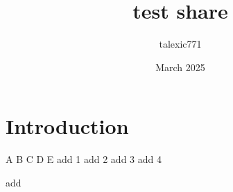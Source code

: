 \documentclass{article}
\title{test share}
\author{talexic771 }
\date{March 2025}
\begin{document}
\maketitle

\section{Introduction}
A
B
C
D
E
add 1
add 2
add 3
add 4

add
\end{document}
